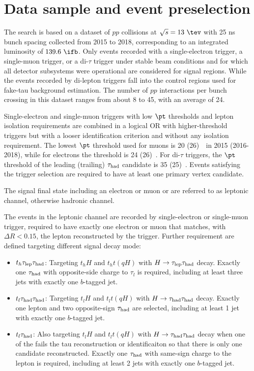 \section{Data sample and event preselection}
\label{sec:data_presel}

The search is based on a dataset of $pp$ collisions at $\sqrt{s}=13~\tev$ with 25 ns bunch spacing collected from 2015 to 2018, corresponding to an integrated luminosity of $139.6~\ifb$.
Only events recorded with a single-electron trigger, a single-muon trigger, or a di-$\tau$ trigger under stable beam conditions 
and for which all detector subsystems were operational are considered for signal regions. While the events recorded by di-lepton triggers fall into the control regions used for fake-tau background estimation.
The number of $pp$ interactions per bunch crossing in this dataset ranges from about 8 to 45, with an average of 24.

Single-electron and single-muon triggers with low $\pt$ thresholds and lepton isolation requirements are combined in a logical OR 
with higher-threshold triggers but with a looser identification criterion and without any isolation requirement.
The lowest $\pt$ threshold used for muons is 20 (26)~\gev\ in 2015 (2016-2018), while for electrons the threshold is 24 (26)~\gev.
For di-$\tau$ triggers, the $\pt$ threshold of the leading (trailing) $\tau_{\mathrm{had}}$ candidate is 35 (25)~\gev.
Events satisfying the trigger selection are required to have at least one primary vertex candidate.

The signal final state including an electron or muon or \lep are referred to as leptonic channel, otherwise hadronic channel.

The events in the leptonic channel are recorded by single-electron or single-muon trigger, required to have exactly one electron or muon that matches, with $\Delta R < 0.15$, the lepton reconstructed by the trigger. Further requirement are defined targeting different signal decay mode:  
\begin{itemize}
\item $t_h\tau_{\mathrm{lep}} \tau_{\mathrm{had}}$: Targeting $t_hH$ and $t_ht(qH)$ with $H\to\tau_{\mathrm{lep}} \tau_{\mathrm{had}}$ decay. Exactly one $\tau_{\mathrm{had}}$ with opposite-side charge to $\tau_l$ is required, including at least three jets with exactly one $b$-tagged jet.
\item $t_l\tau_{\mathrm{had}} \tau_{\mathrm{had}}$: Targeting $t_lH$ and $t_lt(qH)$ with $H\to\tau_{\mathrm{had}} \tau_{\mathrm{had}}$ decay. Exactly one lepton and two opposite-sign $\tau_{\mathrm{had}}$ are selected, including at least 1 jet with exactly one $b$-tagged jet.
\item $t_l\tau_{\mathrm{had}}$: Also targeting $t_lH$ and $t_lt(qH)$ with $H\to\tau_{\mathrm{had}} \tau_{\mathrm{had}}$ decay when one of the \had fails the tau reconstruction or identificaiton so that there is only
  one \had candidate reconstructed. Exactly one $\tau_{\mathrm{had}}$ with same-sign charge to the lepton is required, including at least 2 jets with exactly one $b$-tagged jet.
\end{itemize}

